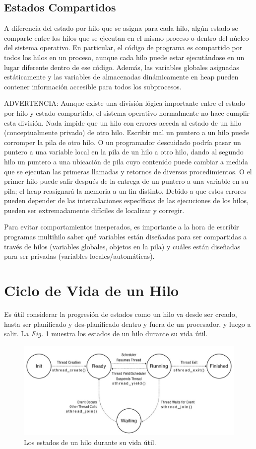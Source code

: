 \documentclass[10pt]{book}
\begin{document}
\subsection{Estados Compartidos}
A diferencia del estado por hilo que se asigna para cada hilo, algún estado se comparte entre los hilos que se ejecutan en el mismo proceso o dentro del núcleo del sistema operativo. En particular, el código de programa es compartido por todos los hilos en un proceso, aunque cada hilo puede estar ejecutándose en un lugar diferente dentro de ese código. Además, las variables globales asignadas estáticamente y las variables de almacenadas dinámicamente en heap pueden contener información accesible para todos los subprocesos.

ADVERTENCIA: Aunque existe una división lógica importante entre el estado por hilo y estado compartido, el sistema operativo normalmente no hace cumplir esta división. Nada impide que un hilo con errores acceda al estado de un hilo (conceptualmente privado) de otro hilo. Escribir mal un puntero a un hilo puede corromper la pila de otro hilo. O un programador descuidado podría pasar un puntero a una variable local en la pila de un hilo a otro hilo, dando al segundo hilo un puntero a una ubicación de pila cuyo contenido puede cambiar a medida que se ejecutan las primeras llamadas y retornos de diversos procedimientos. O el primer hilo puede salir después de la entrega de un puntero a una variable en su pila; el heap reasignará la memoria a un fin distinto. Debido a que estos errores pueden depender de las intercalaciones específicas de las ejecuciones de los hilos, pueden ser extremadamente difíciles de localizar y corregir.

Para evitar comportamientos inesperados, es importante a la hora de escribir programas multihilo saber qué variables están diseñadas para ser compartidas a través de hilos (variables globales, objetos en la pila) y cuáles están diseñadas para ser privadas (variables locales/automáticas).

\section{Ciclo de Vida de un Hilo}
Es útil considerar la progresión de estados como un hilo va desde ser creado, hasta ser planificado y des-planificado dentro y fuera de un procesador, y luego a salir. La \textit{Fig.} \ref{fig0403} muestra los estados de un hilo durante su vida útil.
\begin{figure}[tbhp]
\centerline{\includegraphics[scale=0.50]{img/fig0403}}
\caption{Los estados de un hilo durante su vida útil.}
\label{fig0403}
\end{figure}
\end{document}
